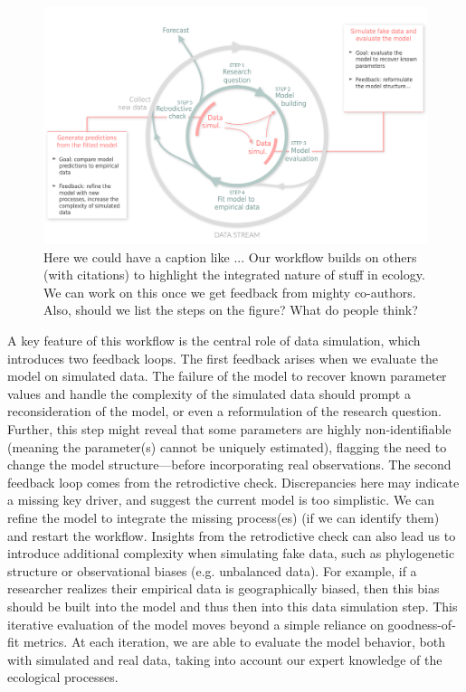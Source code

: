 \documentclass[11pt]{article}
\begin{document}
\begin{figure}[h]
	\centering
    \hspace*{-1.5cm}
	\includegraphics{figures/figure_worflow_wsteps}
	\caption{Here we could have a caption like ... Our workflow builds on others (with citations) to highlight the integrated nature of stuff in ecology. We can work on this once we get feedback from mighty co-authors. Also, should we list the steps on the figure? What do people think?} 
	\label{fig:workflow}
\end{figure}

A key feature of this workflow is the central role of data simulation, which introduces two feedback loops. The first feedback arises when we evaluate the model on simulated data.
The failure of the model to recover known parameter values and handle the complexity of the simulated data should prompt a reconsideration of the model, or even a reformulation of the research question.
Further, this step might reveal that some parameters are highly non-identifiable (meaning the parameter(s) cannot be uniquely estimated),
flagging the need to change the model structure---before incorporating real observations. 
The second feedback loop comes from the retrodictive check. 
Discrepancies here may indicate a missing key driver, and suggest the current model is too simplistic. We can refine the model to integrate the missing process(es) (if we can identify them) and restart the workflow. Insights from the retrodictive check can also lead us to introduce additional complexity when simulating fake data, such as phylogenetic structure or observational biases (e.g. unbalanced data). For example, if a researcher realizes their empirical data is geographically biased, then this bias should be built into the model and thus then into this data simulation step. This iterative evaluation of the model moves beyond a simple reliance on goodness-of-fit metrics. At each iteration, we are able to evaluate the model behavior, both with simulated and real data, taking into account our expert knowledge of the ecological processes. 
\end{document}
